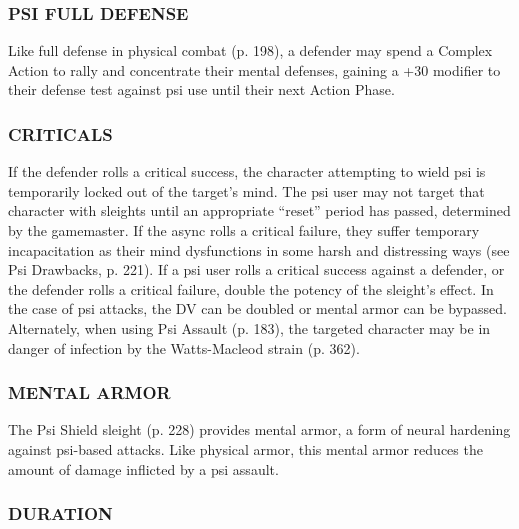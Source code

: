\subsubsection{PSI FULL DEFENSE}

Like full defense in physical combat (p. 198), a defender
may spend a Complex Action to rally and concentrate
their mental defenses, gaining a +30 modifier
to their defense test against psi use until their next
Action Phase.

\subsubsection{CRITICALS}

If the defender rolls a critical success, the character
attempting to wield psi is temporarily locked out of
the target’s mind. The psi user may not target that
character with sleights until an appropriate “reset”
period has passed, determined by the gamemaster.
If the async rolls a critical failure, they suffer temporary
incapacitation as their mind dysfunctions in some
harsh and distressing ways (see Psi Drawbacks, p. 221).
If a psi user rolls a critical success against a defender,
or the defender rolls a critical failure, double
the potency of the sleight’s effect. In the case of psi attacks,
the DV can be doubled or mental armor can be
bypassed. Alternately, when using Psi Assault (p. 183),
the targeted character may be in danger of infection
by the Watts-Macleod strain (p. 362).

\subsubsection{MENTAL ARMOR}

The Psi Shield sleight (p. 228) provides mental armor,
a form of neural hardening against psi-based attacks.
Like physical armor, this mental armor reduces the
amount of damage inflicted by a psi assault.

\subsubsection{DURATION}

